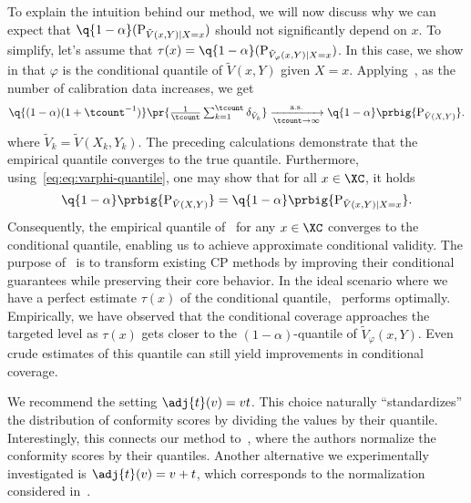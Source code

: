   To explain the intuition behind our method, we will now discuss why we can expect that \(\q{1-\alpha}(\textup{P}_{\tilde{V}(x,Y) \mid X=x})\) should not significantly depend on \(x\). To simplify, let's assume that \(\tau(x)= \q{1-\alpha}(\textup{P}_{\tilde{V}_\varphi(x,Y)\mid X=x})\). In this case, we show in  that \(\varphi\) is the conditional quantile of \(\tilde{V}(x,Y)\) given \(X=x\). Applying~\cite[Lemma~21.2]{van2000asymptotic}, as the number of calibration data increases, we get
  \begin{equation*}
    \textstyle
    \q{(1-\alpha)(1+\tcount^{-1})}\pr{\frac{1}{\tcount} \sum_{k=1}^{\tcount} \delta_{\tilde{V}_{k}}}
    \xrightarrow[\tcount \to \infty]{\text{a.s.}} \q{1-\alpha}\prbig{\textup{P}_{\tilde{V}(X,Y)}}.
  \end{equation*}
  where $\tilde{V}_{k}=\tilde{V}(X_k,Y_k)$. The preceding calculations demonstrate that the empirical quantile converges to the true quantile.
  Furthermore, using~\eqref{eq:eq:varphi-quantile}, one may show that for all $x\in\XC$, it holds 
  \begin{equation*}
    \q{1-\alpha}\prbig{\textup{P}_{\tilde{V}(X,Y)}}
    = \q{1-\alpha}\prbig{ \textup{P}_{\tilde{V}(x,Y)\mid X=x}}.
  \end{equation*}
  Consequently, the empirical quantile of \RCP\ for any $x \in \XC$ converges to the conditional quantile, enabling us to achieve approximate conditional validity.
  The purpose of \RCP\ is to transform existing CP methods by improving their conditional guarantees while preserving their core behavior.
  In the ideal scenario where we have a perfect estimate \(\tau(x)\) of the conditional quantile, \RCP\ performs optimally. Empirically, we have observed that the conditional coverage approaches the targeted level as \(\tau(x)\) gets closer to the \((1-\alpha)\)-quantile of \(\tilde{V}_{\varphi}(x,Y)\). Even crude estimates of this quantile can still yield improvements in conditional coverage.


 We recommend the setting \( \adj{t}(v) = v t \). This choice naturally ``standardizes'' the distribution of conformity scores by dividing the values by their quantile. Interestingly, this connects our method to~\cite{deutschmann2023adaptive}, where the authors normalize the conformity scores by their quantiles. Another alternative we experimentally investigated is \( \adj{t}(v) = v + t \), which corresponds to the normalization considered in~\cite{han2022split}.

